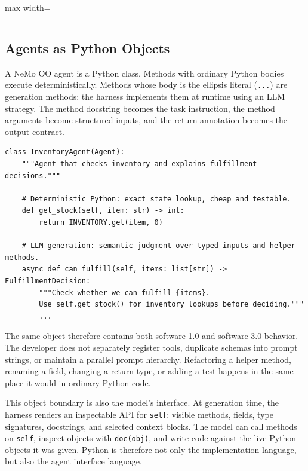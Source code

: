 \documentclass[11pt, logo, onecolumn, copyright, colorlinks=true, allcolors=blue]{nvidiatechreport}
\begin{document}
\begin{landscape}
\begin{table}[p]
\begin{adjustbox}{max width=\linewidth}
\begin{tabular}{p{0.15\linewidth}p{0.075\linewidth}p{0.085\linewidth}p{0.075\linewidth}p{0.075\linewidth}p{0.075\linewidth}p{0.075\linewidth}p{0.31\linewidth}}
\bottomrule
\end{tabular}
\end{adjustbox}
\end{table}
\end{landscape}

\subsection{Agents as Python Objects}
\label{sec:model}

A NeMo OO agent is a Python class.  Methods with ordinary Python bodies execute
deterministically.  Methods whose body is the ellipsis literal
(\texttt{...}) are generation methods: the harness implements them at runtime
using an LLM strategy.  The method docstring becomes the task instruction, the
method arguments become structured inputs, and the return annotation becomes the
output contract.

\begin{lstlisting}
class InventoryAgent(Agent):
    """Agent that checks inventory and explains fulfillment decisions."""

    # Deterministic Python: exact state lookup, cheap and testable.
    def get_stock(self, item: str) -> int:
        return INVENTORY.get(item, 0)

    # LLM generation: semantic judgment over typed inputs and helper methods.
    async def can_fulfill(self, items: list[str]) -> FulfillmentDecision:
        """Check whether we can fulfill {items}.
        Use self.get_stock() for inventory lookups before deciding."""
        ...
\end{lstlisting}

The same object therefore contains both software 1.0 and software 3.0 behavior.
The developer does not separately register tools, duplicate schemas into prompt
strings, or maintain a parallel prompt hierarchy.  Refactoring a helper method,
renaming a field, changing a return type, or adding a test happens in the same
place it would in ordinary Python code.

This object boundary is also the model's interface.  At generation time, the
harness renders an inspectable API for \texttt{self}: visible methods, fields,
type signatures, docstrings, and selected context blocks.  The model can call
methods on \texttt{self}, inspect objects with \texttt{doc(obj)}, and write code
against the live Python objects it was given.  Python is therefore not only the
implementation language, but also the agent interface language.
\end{document}
